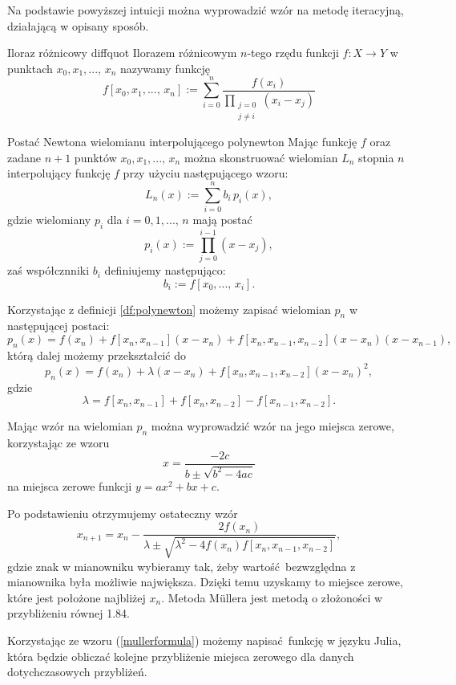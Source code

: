 \documentclass[12pt]{article}
\begin{document}
Na podstawie powyższej intuicji można wyprowadzić wzór na metodę iteracyjną,
działającą w opisany sposób.

\begin{defn}{Iloraz różnicowy \cite{kincaid}}{diffquot}
    Ilorazem różnicowym $n$-tego rzędu funkcji $f: X \to Y$ w punktach
    $x_0, x_1, ...,\,x_n$ nazywamy funkcję
    \[f[x_0, x_1, ...,\, x_n] := \sum_{i=0}^n\frac{f(x_i)}
    {\prod\limits_{\substack{{j=0}\\{j\neq i}}}{(x_i - x_j)}}\]
\end{defn}

\begin{defn}{Postać Newtona wielomianu interpolującego \cite{kincaid}}{polynewton}
    Mając funkcję $f$ oraz zadane $n+1$ punktów $x_0, x_1, ...,\,x_n$ można
    skonstruować wielomian $L_n$ stopnia $n$ interpolujący funkcję $f$ przy 
    użyciu następującego wzoru:
    \[L_n(x) := \sum_{i=0}^n{b_i\,p_i(x)},\]
    gdzie wielomiany $p_i$ dla $i = 0, 1, ...,\,n$ mają postać
    \[p_i(x) := \prod_{j=0}^{i-1}{(x-x_j)},\]
    zaś współcznniki $b_i$ definiujemy następująco:
    \[b_i := f[x_0, ...,\,x_i].\]
\end{defn}

Korzystając z definicji \ref{df:polynewton} możemy zapisać wielomian $p_n$ w
następującej postaci:
\[p_n(x) = f(x_n) + f[x_n, x_{n-1}](x-x_n) 
+ f[x_n, x_{n-1}, x_{n-2}](x-x_{n})(x-x_{n-1}),\]
którą dalej możemy przekształcić do
\[p_n(x) = f(x_n) +  \lambda(x-x_n) + f[x_n, x_{n-1}, x_{n-2}](x-x_n)^2,\]
gdzie
\[\lambda = f[x_n,x_{n-1}] + f[x_n, x_{n-2}] - f[x_{n-1}, x_{n-2}].\]

Mając wzór na wielomian $p_n$ można wyprowadzić wzór na jego miejsca zerowe, 
korzystając ze wzoru
\[x = \frac{-2c}{b \pm \sqrt{b^2 - 4ac}}\]
na miejsca zerowe funkcji $y = ax^2 + bx + c$.

Po podstawieniu otrzymujemy ostateczny wzór
\[x_{n+1} = x_n - 
\frac{2f(x_n)}
{\lambda \pm \sqrt{\lambda^2 -4f(x_n)f[x_n, x_{n-1}, x_{n-2}]}},
\label{mullerformula} \tag{1}\]
gdzie znak w mianowniku wybieramy tak, żeby wartość bezwzględna z mianownika
była możliwie największa. Dzięki temu uzyskamy to miejsce zerowe, które jest
położone najbliżej $x_n$.\newpage
Metoda Müllera jest metodą o złożoności w przybliżeniu równej 1.84.

Korzystając ze wzoru (\ref{mullerformula}) możemy napisać funkcję w języku
Julia, która będzie obliczać kolejne przybliżenie miejsca zerowego dla danych
dotychczasowych przybliżeń.
\end{document}
